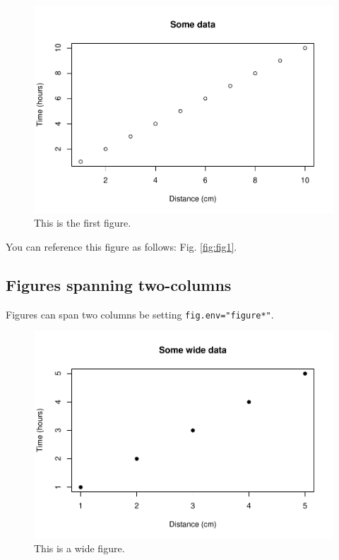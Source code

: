 \documentclass[webpdf,large,contemporary,namedate]{oup-authoring-template}
\theoremstyle{thmstyleone}
\theoremstyle{thmstyletwo}
\theoremstyle{thmstylethree}
\begin{document}
\begin{figure}[th]
\includegraphics[width=1\linewidth]{Article_hybrids_tolerance_files/figure-latex/figa-1} \caption{This is the first figure.}\label{fig:figa}
\end{figure}

You can reference this figure as follows: Fig. \ref{fig:fig1}.

\hypertarget{figures-spanning-two-columns}{%
\subsection{Figures spanning
two-columns}\label{figures-spanning-two-columns}}

Figures can span two columns be setting \texttt{fig.env="figure*"}.

\begin{figure}[th]
\includegraphics[width=1\linewidth]{Article_hybrids_tolerance_files/figure-latex/figb-1} \caption{This is a wide figure.}\label{fig:figb}
\end{figure}
\end{document}
